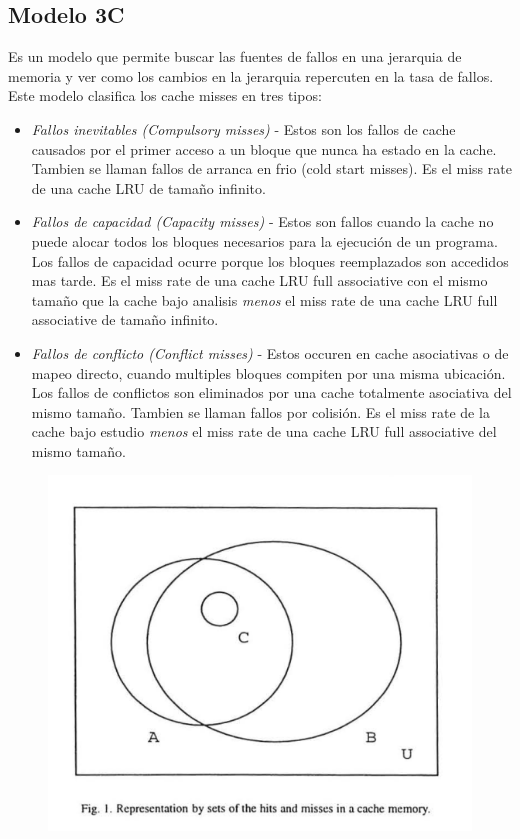 \documentclass{article}
\begin{document}
\subsection{Modelo 3C}
Es un modelo que permite buscar las fuentes de fallos en una jerarquia de memoria  y ver como los cambios en la jerarquia repercuten en la tasa de fallos.
Este modelo clasifica los cache misses en tres tipos:
\begin{itemize} 
    \item \textit{Fallos inevitables (Compulsory misses)} - Estos son los fallos de cache causados por el primer acceso a un bloque que nunca ha estado en la cache. Tambien se llaman fallos de arranca en frio (cold start misses). Es el miss rate de una cache LRU de tamaño infinito.
    \item \textit{Fallos de capacidad (Capacity misses)} - Estos son fallos cuando la cache no puede alocar todos los bloques necesarios para la ejecución de un programa. Los fallos de capacidad ocurre porque los bloques reemplazados son accedidos mas tarde. Es el miss rate de una cache LRU full associative con el mismo tamaño que la cache bajo analisis \textit{menos} el miss rate de una cache LRU full associative de tamaño infinito.
    \item \textit{Fallos de conflicto (Conflict misses)} - Estos occuren en cache asociativas o de mapeo directo, cuando multiples bloques compiten por una misma ubicación. Los fallos de conflictos son eliminados por una cache totalmente asociativa del mismo tamaño. Tambien se llaman fallos por colisión. Es el miss rate de la cache bajo estudio \textit{menos} el miss rate de una cache LRU full associative del mismo tamaño. 
\end{itemize}

\newpage
\begin{figure}[h!]
    \includegraphics[width=\linewidth]{imagenes/Conjuntos3C.png}
\end{figure}
\end{document}
